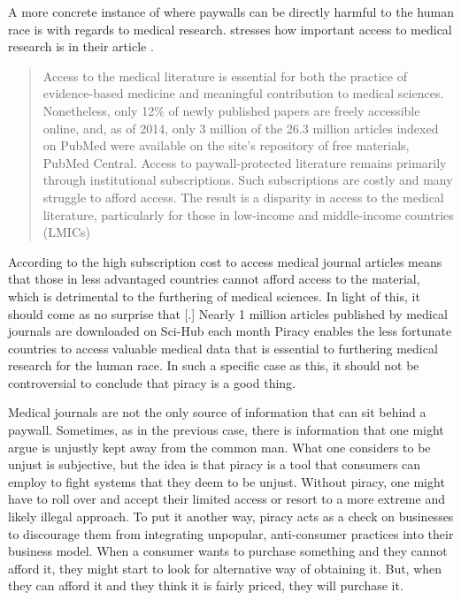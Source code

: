 \documentclass[onecolumn, 12pt]{article}
\begin{document}
\begin{refsection}
A more concrete instance of where paywalls can be directly harmful to the human race is
with regards to medical research. \citeauthor{till:medical-literature} stresses how important
access to medical research is in their article .
\blockcquote{till:medical-literature}[.]{%
  Access to the medical literature is essential for both the practice of
  evidence-based medicine and meaningful contribution to medical sciences.
  Nonetheless, only 12\% of newly published papers are freely accessible online,
  and, as of 2014, only 3 million of the 26.3 million articles indexed on PubMed
  were available on the site's repository of free materials, PubMed Central.
  Access to paywall-protected literature remains primarily through institutional
  subscriptions. Such subscriptions are costly and many struggle to afford
  access. The result is a disparity in access to the medical literature,
  particularly for those in low-income and middle-income countries (LMICs)%
}
According to \citeauthor{till:medical-literature} the high subscription cost to access medical
journal articles means that those in less advantaged countries cannot afford access to the
material, which is detrimental to the furthering of medical sciences. In light of this, it
should come as no surprise that [.]{
  Nearly 1 million articles published by medical journals are downloaded on
  Sci-Hub each month%
} Piracy enables the less fortunate countries to access valuable medical data that is
essential to furthering medical research for the human race. In such a specific case as
this, it should not be controversial to conclude that piracy is a good thing.

Medical journals are not the only source of information that can sit behind a paywall.
Sometimes, as in the previous case, there is information that one might argue is unjustly
kept away from the common man. What one considers to be unjust is subjective, but the idea
is that piracy is a tool that consumers can employ to fight systems that they deem to be
unjust. Without piracy, one might have to roll over and accept their limited access or
resort to a more extreme and likely illegal approach. To put it another way, piracy acts
as a check on businesses to discourage them from integrating unpopular, anti-consumer
practices into their business model. When a consumer wants to purchase something and they
cannot afford it, they might start to look for alternative way of obtaining it. But, when
they can afford it and they think it is fairly priced, they will purchase it.


\end{refsection}
\end{document}
